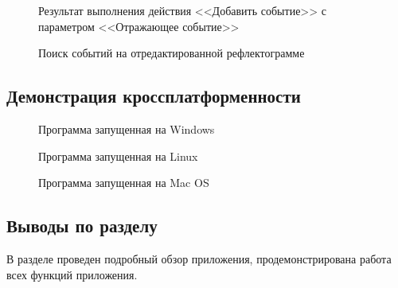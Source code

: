 \begin{figure}[H]
  \caption{Результат выполнения действия <<Добавить событие>> с параметром <<Отражающее событие>>}
  \label{ris:reflection_event_added}
\end{figure}

\begin{figure}[H]
  \caption{Поиск событий на отредактированной рефлектограмме}
  \label{ris:events_after_editing}
\end{figure}

\subsection{Демонстрация кроссплатформенности}

\begin{figure}[H]
  \caption{Программа запущенная на Windows}
  \label{ris:windows}
\end{figure}

\begin{figure}[H]
  \caption{Программа запущенная на Linux}
  \label{ris:linux}
\end{figure}

\begin{figure}[H]
  \caption{Программа запущенная на Mac OS}
  \label{ris:macos}
\end{figure}

\subsection{Выводы по разделу}

В разделе проведен подробный обзор приложения, продемонстрирована работа всех функций приложения.
